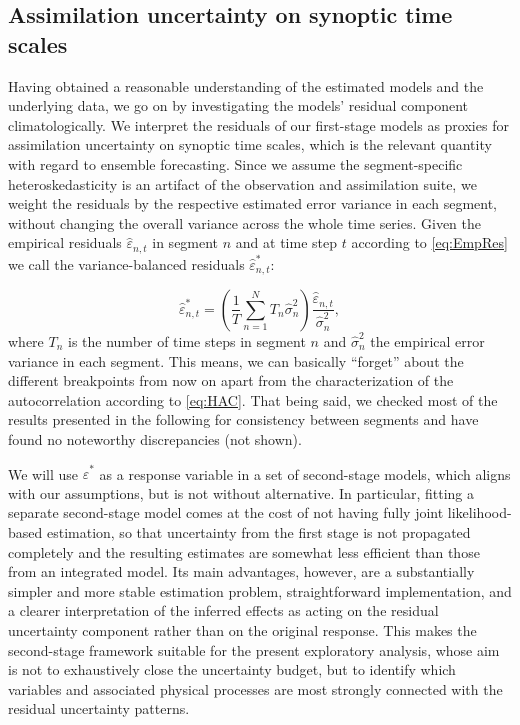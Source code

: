 \subsection{Assimilation uncertainty on synoptic time scales} \label{sec:EDA_WRetc}
Having obtained a reasonable understanding of the estimated models and the underlying data, we go on by investigating the models' residual component climatologically. We interpret the residuals of our first-stage models as proxies for assimilation uncertainty on synoptic time scales, which is the relevant quantity with regard to ensemble forecasting. Since we assume the segment-specific heteroskedasticity is an artifact of the observation and assimilation suite, we weight the residuals by the respective estimated error variance in each segment, without changing the overall variance across the whole time series. Given the empirical residuals $\hat{\varepsilon}_{n,t}$ in segment $n$ and at time step $t$ according to \cref{eq:EmpRes} we call the variance-balanced residuals $\hat{\varepsilon}^*_{n,t}$:

\begin{equation}\label{eq:VarBalance}
    \hat{\varepsilon}^*_{n,t} = \left(\frac{1}{T}\sum_{n=1}^N T_n \hat{\sigma}_n^2 \right )\frac{\hat{\varepsilon}_{n,t}}{\hat{\sigma}_n^2},
\end{equation}
where $T_n$ is the number of time steps in segment $n$ and $\hat{\sigma}_n^2$ the empirical error variance in each segment. This means, we can basically \enquote{forget} about the different breakpoints from now on apart from the characterization of the autocorrelation according to \cref{eq:HAC}. That being said, we checked most of the results presented in the following for consistency between segments and have found no noteworthy discrepancies (not shown).

We will use $\hat{\varepsilon}^*$ as a response variable in a set of second-stage models, which aligns with our assumptions, but is not without alternative. In particular, fitting a separate second-stage model comes at the cost of not having fully joint likelihood-based estimation, so that uncertainty from the first stage is not propagated completely and the resulting estimates are somewhat less efficient than those from an integrated model. Its main advantages, however, are a substantially simpler and more stable estimation problem, straightforward implementation, and a clearer interpretation of the inferred effects as acting on the residual uncertainty component rather than on the original response. This makes the second-stage framework suitable for the present exploratory analysis, whose aim is not to exhaustively close the uncertainty budget, but to identify which variables and associated physical processes are most strongly connected with the residual uncertainty patterns.

